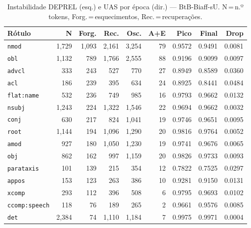 

\begin{table}[ht]
\centering
\caption{Instabilidade DEPREL (esq.) e UAS por época (dir.) --- BtB-Biaff-sU. N\,=\,n.º tokens, Forg.\,=\,esquecimentos, Rec.\,=\,recuperações.}
\label{tab:inst-bert-base-portuguese-cased-predictions-ablacao-biaffine}
\begin{minipage}[t]{0.54\linewidth}
\centering\tiny
\begin{tabular}{lrrrrrrrr}
\toprule
\textbf{Rótulo} & \textbf{N} & \textbf{Forg.} & \textbf{Rec.} & \textbf{Osc.} & \textbf{A+E} & \textbf{Pico} & \textbf{Final} & \textbf{Drop} \\
\midrule
\texttt{nmod} & 1,729 & 1,093 & 2,161 & 3,254 & 79 & 0.9572 & 0.9491 & 0.0081 \\
\texttt{obl} & 1,132 & 789 & 1,766 & 2,555 & 88 & 0.9196 & 0.9099 & 0.0097 \\
\texttt{advcl} & 333 & 243 & 527 & 770 & 27 & 0.8949 & 0.8589 & 0.0360 \\
\texttt{acl} & 186 & 239 & 395 & 634 & 24 & 0.8925 & 0.8441 & 0.0484 \\
\texttt{flat\!:\!name} & 532 & 236 & 749 & 985 & 16 & 0.9793 & 0.9662 & 0.0132 \\
\texttt{nsubj} & 1,243 & 224 & 1,322 & 1,546 & 22 & 0.9694 & 0.9662 & 0.0032 \\
\texttt{conj} & 630 & 217 & 824 & 1,041 & 19 & 0.9746 & 0.9651 & 0.0095 \\
\texttt{root} & 1,144 & 194 & 1,096 & 1,290 & 20 & 0.9816 & 0.9764 & 0.0052 \\
\texttt{amod} & 927 & 180 & 1,050 & 1,230 & 19 & 0.9741 & 0.9676 & 0.0065 \\
\texttt{obj} & 862 & 162 & 997 & 1,159 & 20 & 0.9826 & 0.9733 & 0.0093 \\
\texttt{parataxis} & 101 & 139 & 215 & 354 & 12 & 0.7822 & 0.7525 & 0.0297 \\
\texttt{appos} & 153 & 123 & 263 & 386 & 10 & 0.9281 & 0.9150 & 0.0131 \\
\texttt{xcomp} & 293 & 112 & 396 & 508 & 6 & 0.9795 & 0.9693 & 0.0102 \\
\texttt{ccomp\!:\!speech} & 118 & 76 & 189 & 265 & 2 & 0.9661 & 0.9576 & 0.0085 \\
\texttt{det} & 2,384 & 74 & 1,110 & 1,184 & 7 & 0.9975 & 0.9971 & 0.0004 \\
\bottomrule
\end{tabular}
\end{minipage}

\end{table}
